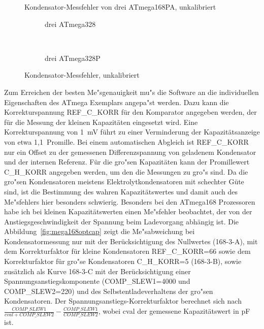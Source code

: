 \begin{figure}[H]
\centering

\caption{Kondensator-Messfehler von drei ATmega168PA, unkalibriert}
\label{fig:mega168PAall}
\end{figure}

\begin{figure}[H]
  \begin{subfigure}[b]{9cm}
    \centering
    \resizebox{9cm}{!}{}
    \caption{drei ATmega328}
    \label{fig:mega328all}
  \end{subfigure}
  ~
  \begin{subfigure}[b]{9cm}
    \centering
    \resizebox{9cm}{!}{}
    \caption{drei ATmega328P}
    \label{fig:mega328Pall}
  \end{subfigure}
  \caption{Kondensator-Messfehler, unkalibriert}
\end{figure}

Zum Erreichen der besten Me"sgenauigkeit mu"s die Software an die individuellen Eigenschaften des ATmega Exemplars
angepa"st werden. Dazu kann die Korrekturspannung REF\_C\_KORR f\"ur den Komparator angegeben werden, der f\"ur die Messung der kleinen 
Kapazit\"aten eingesetzt wird. Eine Korrekturspannung von 1~mV f\"uhrt zu einer Verminderung der Kapazit\"atsanzeige von etwa 1,1~Promille.
Bei einem automatischen Abgleich ist REF\_C\_KORR  nur ein Offset zu der gemessenen Differenzspannung von geladenem Kondensator
und der internen Referenz.
F\"ur die gro"sen Kapazit\"aten kann der Promillewert C\_H\_KORR angegeben werden, um den die Messungen
zu gro"s sind.
Da die gro"sen Kondensatoren meistens Elektrolytkondensatoren mit schechter G\"ute sind, ist die Bestimmung
des wahren Kapazit\"atswertes und damit auch des Me"sfehlers hier besonders schwierig.
Besonders bei den ATmega168 Prozessoren habe ich bei kleinen Kapazit\"atswerten einen Me"sfehler beobachtet, 
der von der Anstiegsgeschwindigkeit der Spannung beim Ladevorgang abh\"angig ist.
Die Abbildung~\ref{fig:mega168optcap} zeigt die Me"sabweichung bei Kondensatormessung nur mit der Ber\"ucksichtigung des
Nullwertes (168-3-A), mit dem Korrekturfaktor f\"ur kleine Kondensatoren REF\_C\_KORR=66 sowie dem Korrekturfaktor f\"ur gro"se
Kondensatoren C\_H\_KORR=5 (168-3-B), sowie zus\"atzlich als Kurve 168-3-C  mit der Ber\"ucksichtigung einer Spannungsanstiegskomponente 
(COMP\_SLEW1=4000 und COMP\_SLEW2=220) und des Selbstentladeverhaltens der gro"sen Kondensatoren.
Der Spannungsanstiegs-Korrekturfaktor berechnet sich nach \(\frac{COMP\_SLEW1}{cval+COMP\_SLEW2} - \frac{COMP\_SLEW1}{COMP\_SLEW2}\),
wobei cval der gemessene Kapazit\"atswert in pF ist.

